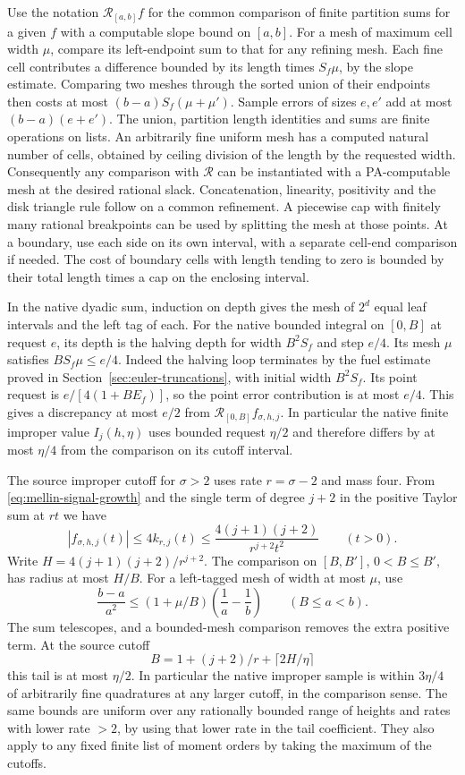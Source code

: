 \documentclass[11pt]{amsart}
\theoremstyle{definition}
\theoremstyle{remark}
\numberwithin{equation}{section}
\begin{document}
Use the notation \(\mathcal R_{[a,b]} f\) for the common
comparison of finite partition sums for a given \(f\) with a
computable slope bound on \([a,b]\). For a mesh of maximum cell
width \(\mu\), compare its left-endpoint sum to that for any
refining mesh. Each fine cell contributes a difference bounded
by its length times \(S_f\mu\), by the slope estimate. Comparing
two meshes through the sorted union of their endpoints
then costs at most \((b-a)S_f(\mu+\mu')\).
Sample errors of sizes \(e,e'\) add at most \((b-a)(e+e')\).
The union, partition length identities and sums are finite
operations on lists. An arbitrarily fine uniform mesh has a
computed natural number of cells, obtained by ceiling division
of the length by the requested width. Consequently any
comparison with \(\mathcal R\) can be instantiated with a
PA-computable mesh at the desired rational slack. Concatenation,
linearity, positivity and the disk triangle rule follow on a
common refinement. A piecewise cap with finitely many rational
breakpoints can be used by splitting the mesh at those points.
At a boundary, use each side on its own interval, with a separate
cell-end comparison if needed. The cost of boundary cells with
length tending to zero is bounded by their total length times a
cap on the enclosing interval.

In the native dyadic sum, induction on depth gives the mesh of
\(2^d\) equal leaf intervals and the left tag of each.
For the native bounded integral on \([0,B]\) at request \(e\),
its depth is the halving depth for width \(B^2S_f\) and step
\(e/4\). Its mesh \(\mu\) satisfies \(B S_f\mu\le e/4\).
Indeed the halving loop terminates by the fuel estimate proved in
Section~\ref{sec:euler-truncations}, with initial width \(B^2S_f\).
Its point request is \(e/[4(1+B E_f)]\), so the point
error contribution is at most \(e/4\). This gives a discrepancy
at most \(e/2\) from \(\mathcal R_{[0,B]} f_{\sigma,h,j}\).
In particular the native finite improper value \(I_j(h,\eta)\)
uses bounded request \(\eta/2\) and therefore differs by at most
\(\eta/4\) from the comparison on its cutoff interval.

The source improper cutoff for \(\sigma>2\) uses rate \(r=\sigma-2\)
and mass four. From \eqref{eq:mellin-signal-growth} and the
single term of degree \(j+2\) in the positive Taylor sum at
\(rt\) we have
\[
 |f_{\sigma,h,j}(t)|\le 4 k_{r,j}(t)
      \le \frac{4(j+1)(j+2)}{r^{j+2}t^2}\qquad(t>0).
\]
Write \(H=4(j+1)(j+2)/r^{j+2}\). The comparison on
\([B,B']\), \(0<B\le B'\), has radius at most \(H/B\).
For a left-tagged mesh of width at most \(\mu\), use
\[
  \frac{b-a}{a^2}
     \le (1+\mu/B)\left(\frac1a-\frac1b\right)
       \qquad (B\le a<b).
\]
The sum telescopes, and a bounded-mesh comparison removes the
extra positive term. At the source cutoff
\[
                B=1+(j+2)/r+\lceil 2H/\eta\rceil
\]
this tail is at most \(\eta/2\). In particular the native
improper sample is within \(3\eta/4\) of arbitrarily fine
quadratures at any larger cutoff, in the comparison sense.
The same bounds are uniform over any rationally bounded range of
heights and rates with lower rate \(>2\), by using that lower rate
in the tail coefficient. They also apply to any fixed finite
list of moment orders by taking the maximum of the cutoffs.
\end{document}
